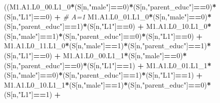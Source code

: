 \documentclass[
]{book}
\newenvironment{Shaded}{\begin{snugshade}}{\end{snugshade}}
\newcommand{\CommentTok}[1]{\textcolor[rgb]{0.56,0.35,0.01}{\textit{#1}}}
\newcommand{\DecValTok}[1]{\textcolor[rgb]{0.00,0.00,0.81}{#1}}
\newcommand{\NormalTok}[1]{#1}
\newcommand{\SpecialCharTok}[1]{\textcolor[rgb]{0.81,0.36,0.00}{\textbf{#1}}}
\newcommand{\StringTok}[1]{\textcolor[rgb]{0.31,0.60,0.02}{#1}}
\begin{document}
\begin{Shaded}
\begin{Highlighting}[]
\NormalTok{      ((M1.A1.L0\_00.L1\_0}\SpecialCharTok{*}\NormalTok{(S[n,}\StringTok{"male"}\NormalTok{]}\SpecialCharTok{==}\DecValTok{0}\NormalTok{)}\SpecialCharTok{*}\NormalTok{(S[n,}\StringTok{"parent\_educ"}\NormalTok{]}\SpecialCharTok{==}\DecValTok{0}\NormalTok{)}\SpecialCharTok{*}\NormalTok{(S[n,}\StringTok{"L1"}\NormalTok{]}\SpecialCharTok{==}\DecValTok{0}\NormalTok{) }\SpecialCharTok{+} \CommentTok{\# A\textquotesingle{}=1             }
\NormalTok{          M1.A1.L0\_01.L1\_0}\SpecialCharTok{*}\NormalTok{(S[n,}\StringTok{"male"}\NormalTok{]}\SpecialCharTok{==}\DecValTok{0}\NormalTok{)}\SpecialCharTok{*}\NormalTok{(S[n,}\StringTok{"parent\_educ"}\NormalTok{]}\SpecialCharTok{==}\DecValTok{1}\NormalTok{)}\SpecialCharTok{*}\NormalTok{(S[n,}\StringTok{"L1"}\NormalTok{]}\SpecialCharTok{==}\DecValTok{0}\NormalTok{) }\SpecialCharTok{+}
\NormalTok{          M1.A1.L0\_10.L1\_0}\SpecialCharTok{*}\NormalTok{(S[n,}\StringTok{"male"}\NormalTok{]}\SpecialCharTok{==}\DecValTok{1}\NormalTok{)}\SpecialCharTok{*}\NormalTok{(S[n,}\StringTok{"parent\_educ"}\NormalTok{]}\SpecialCharTok{==}\DecValTok{0}\NormalTok{)}\SpecialCharTok{*}\NormalTok{(S[n,}\StringTok{"L1"}\NormalTok{]}\SpecialCharTok{==}\DecValTok{0}\NormalTok{) }\SpecialCharTok{+} 
\NormalTok{          M1.A1.L0\_11.L1\_0}\SpecialCharTok{*}\NormalTok{(S[n,}\StringTok{"male"}\NormalTok{]}\SpecialCharTok{==}\DecValTok{1}\NormalTok{)}\SpecialCharTok{*}\NormalTok{(S[n,}\StringTok{"parent\_educ"}\NormalTok{]}\SpecialCharTok{==}\DecValTok{1}\NormalTok{)}\SpecialCharTok{*}\NormalTok{(S[n,}\StringTok{"L1"}\NormalTok{]}\SpecialCharTok{==}\DecValTok{0}\NormalTok{) }\SpecialCharTok{+}
\NormalTok{          M1.A1.L0\_00.L1\_1}\SpecialCharTok{*}\NormalTok{(S[n,}\StringTok{"male"}\NormalTok{]}\SpecialCharTok{==}\DecValTok{0}\NormalTok{)}\SpecialCharTok{*}\NormalTok{(S[n,}\StringTok{"parent\_educ"}\NormalTok{]}\SpecialCharTok{==}\DecValTok{0}\NormalTok{)}\SpecialCharTok{*}\NormalTok{(S[n,}\StringTok{"L1"}\NormalTok{]}\SpecialCharTok{==}\DecValTok{1}\NormalTok{) }\SpecialCharTok{+}
\NormalTok{          M1.A1.L0\_01.L1\_1}\SpecialCharTok{*}\NormalTok{(S[n,}\StringTok{"male"}\NormalTok{]}\SpecialCharTok{==}\DecValTok{0}\NormalTok{)}\SpecialCharTok{*}\NormalTok{(S[n,}\StringTok{"parent\_educ"}\NormalTok{]}\SpecialCharTok{==}\DecValTok{1}\NormalTok{)}\SpecialCharTok{*}\NormalTok{(S[n,}\StringTok{"L1"}\NormalTok{]}\SpecialCharTok{==}\DecValTok{1}\NormalTok{) }\SpecialCharTok{+}
\NormalTok{          M1.A1.L0\_10.L1\_1}\SpecialCharTok{*}\NormalTok{(S[n,}\StringTok{"male"}\NormalTok{]}\SpecialCharTok{==}\DecValTok{1}\NormalTok{)}\SpecialCharTok{*}\NormalTok{(S[n,}\StringTok{"parent\_educ"}\NormalTok{]}\SpecialCharTok{==}\DecValTok{0}\NormalTok{)}\SpecialCharTok{*}\NormalTok{(S[n,}\StringTok{"L1"}\NormalTok{]}\SpecialCharTok{==}\DecValTok{1}\NormalTok{) }\SpecialCharTok{+}

\end{Highlighting}
\end{Shaded}
\end{document}
